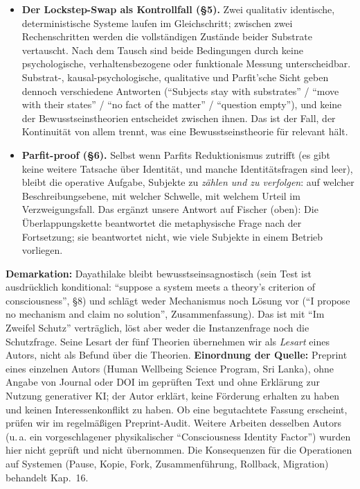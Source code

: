 \documentclass[acmlarge, noacm]{acmart}
\begin{document}
\begin{itemize}
\item \textbf{Der Lockstep-Swap als Kontrollfall (§5).} Zwei qualitativ identische, deterministische Systeme laufen im Gleichschritt; zwischen zwei Rechenschritten werden die vollständigen Zustände beider Substrate vertauscht. Nach dem Tausch sind beide Bedingungen durch keine psychologische, verhaltensbezogene oder funktionale Messung unterscheidbar. Substrat-, kausal-psychologische, qualitative und Parfit'sche Sicht geben dennoch verschiedene Antworten (``Subjects stay with substrates'' / ``move with their states'' / ``no fact of the matter'' / ``question empty''), und keine der Bewusstseinstheorien entscheidet zwischen ihnen. Das ist der Fall, der Kontinuität von allem trennt, was eine Bewusstseinstheorie für relevant hält.
\item \textbf{Parfit-proof (§6).} Selbst wenn Parfits Reduktionismus zutrifft (es gibt keine weitere Tatsache über Identität, und manche Identitätsfragen sind leer), bleibt die operative Aufgabe, Subjekte zu \textit{zählen und zu verfolgen}: auf welcher Beschreibungsebene, mit welcher Schwelle, mit welchem Urteil im Verzweigungsfall. Das ergänzt unsere Antwort auf Fischer (oben): Die Überlappungskette beantwortet die metaphysische Frage nach der Fortsetzung; sie beantwortet nicht, wie viele Subjekte in einem Betrieb vorliegen.
\end{itemize}

\textbf{Demarkation:} Dayathilake bleibt bewusstseinsagnostisch (sein Test ist ausdrücklich konditional: ``suppose a system meets a theory's criterion of consciousness'', §8) und schlägt weder Mechanismus noch Lösung vor (``I propose no mechanism and claim no solution'', Zusammenfassung). Das ist mit ``Im Zweifel Schutz'' verträglich, löst aber weder die Instanzenfrage noch die Schutzfrage. Seine Lesart der fünf Theorien übernehmen wir als \textit{Lesart} eines Autors, nicht als Befund über die Theorien. \textbf{Einordnung der Quelle:} Preprint eines einzelnen Autors (Human Wellbeing Science Program, Sri Lanka), ohne Angabe von Journal oder DOI im geprüften Text und ohne Erklärung zur Nutzung generativer KI; der Autor erklärt, keine Förderung erhalten zu haben und keinen Interessenkonflikt zu haben. Ob eine begutachtete Fassung erscheint, prüfen wir im regelmäßigen Preprint-Audit. Weitere Arbeiten desselben Autors (u.\,a. ein vorgeschlagener physikalischer ``Consciousness Identity Factor'') wurden hier nicht geprüft und nicht übernommen. Die Konsequenzen für die Operationen auf Systemen (Pause, Kopie, Fork, Zusammenführung, Rollback, Migration) behandelt Kap.~16.
\end{document}
